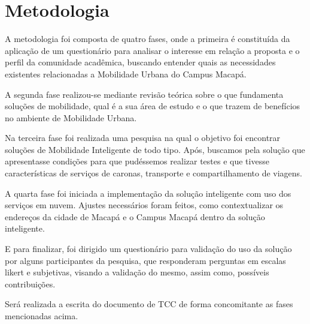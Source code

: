 %
%

\chapter{Metodologia}\label{chap:Metodologia} 
A metodologia foi composta de quatro fases, onde a primeira é constituída da aplicação de um questionário para analisar o interesse em relação a proposta e o perfil da comunidade acadêmica, buscando entender quais as necessidades existentes relacionadas a Mobilidade Urbana do Campus Macapá.%

A segunda fase realizou-se mediante revisão teórica sobre o que fundamenta soluções de mobilidade, qual é a sua área de estudo e o que trazem de benefícios no ambiente de Mobilidade Urbana.

Na terceira fase foi realizada uma pesquisa na qual o objetivo foi encontrar soluções de Mobilidade Inteligente de todo tipo. Após, buscamos pela solução que apresentasse condições para que pudéssemos realizar testes e que tivesse características de serviços de caronas, transporte e compartilhamento de viagens. 

A quarta fase foi iniciada a implementação da solução inteligente com uso dos serviços em nuvem. Ajustes necessários foram feitos, como contextualizar os endereços da cidade de Macapá e o Campus Macapá dentro da solução inteligente.  

E para finalizar, foi dirigido um questionário para  validação do uso da solução por alguns participantes da pesquisa, que responderam perguntas em escalas likert e subjetivas, visando a validação do mesmo, assim como, possíveis contribuições. 

Será realizada a escrita do documento de TCC de forma concomitante as fases mencionadas acima.


